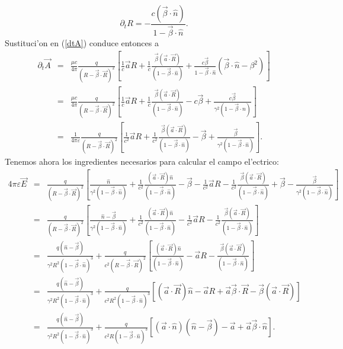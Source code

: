 \begin{equation}
\boxed{\partial_t R=-\frac{c(\vec\beta\cdot\hat{n})}{1-\vec{\beta}\cdot\hat{n}}.}
\end{equation}
Sustituci'on en (\ref{dtA}) conduce entonces a
\begin{eqnarray}
 \partial_t \vec{A}
&=&\frac{\mu c}{4\pi}\frac{q}{(R-\vec{\beta}\cdot\vec{R})^2}\left[\frac{1}{c}\vec{a}R+\frac{1}{c}
\frac{\vec{\beta}(\vec{a}\cdot\vec{R})}{(1-\vec{\beta}\cdot\hat{n})}+\frac{c\vec\beta}{1-\vec{\beta}\cdot\hat{n}}(\vec{\beta}\cdot\hat{n}-\beta^2)\right] \\
&=&\frac{\mu c}{4\pi}\frac{q}{(R-\vec{\beta}\cdot\vec{R})^2}\left[\frac{1}{c}\vec{a}R+\frac{1}{c}
\frac{\vec{\beta}(\vec{a}\cdot\vec{R})}{(1-\vec{\beta}\cdot\hat{n})}-c\vec\beta+\frac{c\vec\beta}{\gamma^2(1-\vec{\beta}\cdot\hat{n})}\right] \\
&=&\frac{1}{4\pi\varepsilon}\frac{q}{(R-\vec{\beta}\cdot\vec{R})^2}\left[\frac{1}{c^2}\vec{a}R+\frac{1}{c^2}\frac{\vec{\beta}(\vec{a}\cdot\vec{R})}{(1-\vec{\beta}\cdot\hat{n})}-\vec\beta+\frac{\vec\beta}{\gamma^2(1-\vec{\beta}\cdot\hat{n})}\right] .
\end{eqnarray}
Tenemos ahora los ingredientes necesarios para calcular el campo el'ectrico:
\begin{eqnarray}
4\pi\varepsilon\vec{E}&=&\frac{q}{(R-\vec{\beta}\cdot\vec{R})^2}\left[\frac{\hat{n}}{\gamma^2(1-\vec{\beta}\cdot\hat{n})}+\frac{1}{c^2}\frac{(\vec{a}\cdot\vec{R})\hat{n}}{(1-\vec{\beta}\cdot\hat{n})}-\vec\beta-\frac{1}{c^2}\vec{a}R-\frac{1}{c^2}\frac{\vec{\beta}(\vec{a}\cdot\vec{R})}{(1-\vec{\beta}\cdot\hat{n})}+\vec\beta-\frac{\vec\beta}{\gamma^2(1-\vec{\beta}\cdot\hat{n})}\right] \nonumber \\
&=&\frac{q}{(R-\vec{\beta}\cdot\vec{R})^2}\left[\frac{\hat{n}-\vec\beta}{\gamma^2(1-\vec{\beta}\cdot\hat{n})}+\frac{1}{c^2}\frac{(\vec{a}\cdot\vec{R})\hat{n}}{(1-\vec{\beta}\cdot\hat{n})}-\frac{1}{c^2}\vec{a}R-\frac{1}{c^2}\frac{\vec{\beta}(\vec{a}\cdot\vec{R})}{(1-\vec{\beta}\cdot\hat{n})}\right] \\
&=&\frac{q(\hat{n}-\vec\beta)}{\gamma^2R^2(1-\vec{\beta}\cdot\hat{n})^3}+\frac{q}{c^2(R-\vec{\beta}\cdot\vec{R})^2}\left[\frac{(\vec{a}\cdot\vec{R})\hat{n}}{(1-\vec{\beta}\cdot\hat{n})}-\vec{a}R-\frac{\vec{\beta}(\vec{a}\cdot\vec{R})}{(1-\vec{\beta}\cdot\hat{n})}\right] \\
&=&\frac{q(\hat{n}-\vec\beta)}{\gamma^2R^2(1-\vec{\beta}\cdot\hat{n})^3}+\frac{q}{c^2R^2(1-\vec{\beta}\cdot\hat{n})^3}\left[(\vec{a}\cdot\vec{R})\hat{n}-\vec{a}R+\vec{a}\vec{\beta}\cdot\vec{R}-\vec{\beta}(\vec{a}\cdot\vec{R})\right] \\
&=&\frac{q(\hat{n}-\vec\beta)}{\gamma^2R^2(1-\vec{\beta}\cdot\hat{n})^3}+\frac{q}{c^2R(1-\vec{\beta}\cdot\hat{n})^3}\left[(\vec{a}\cdot\hat{n})(\hat{n}-\vec{\beta})-\vec{a}+\vec{a}\vec{\beta}\cdot\hat{n}\right] .
\end{eqnarray}
